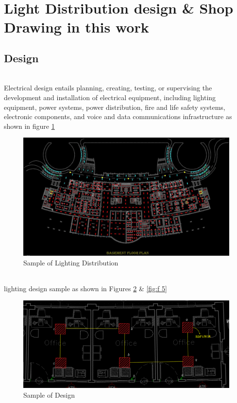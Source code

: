 \documentclass[12pt,fleqn]{book} %
\begin{document}
\section{Light Distribution design \& Shop Drawing  in this work}
\subsection{Design}
\\Electrical design entails planning, creating, testing, or supervising the development and installation of electrical equipment, including lighting equipment, power systems, power distribution, fire and life safety systems, electronic components, and voice and data communications infrastructure as shown in figure \ref{fig:fikry 24}

    \begin{figure}[!h]
    \centering
    \includegraphics[width=1\linewidth]{fikry 24.png}
    \caption{Sample of Lighting Distribution}
    \label{fig:fikry 24}
\end{figure}
\newpage
\\ lighting design sample  as shown in Figures \ref{fig:f 4} \& \ref{fig:f 5}
  \begin{figure}[!h]
    \centering
    \includegraphics[width=1\linewidth]{f 4.png}
    \caption{Sample of Design}
    \label{fig:f 4}
\end{figure}
\end{document}
